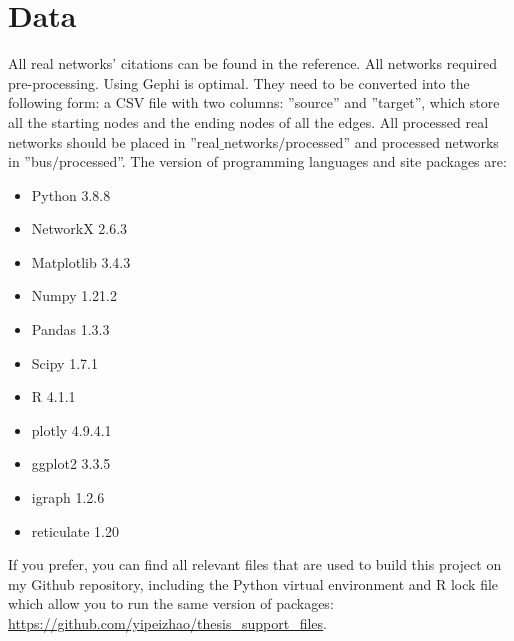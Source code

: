 \documentclass[12pt]{article}
\begin{document}
\appendix
\section{Data}
All real networks' citations can be found in the reference. All networks required pre-processing. Using Gephi is optimal. They need to be converted into the following form: a CSV file with two columns: ''source'' and ''target'', which store all the starting nodes and the ending nodes of all the edges. All processed real networks should be placed in ''real$\_$networks$/$processed'' and processed networks in ''bus$/$\-processed''. The version of programming languages and site packages are:
\begin{itemize}
    \item Python 3.8.8
    \item NetworkX 2.6.3
    \item Matplotlib 3.4.3
    \item Numpy 1.21.2
    \item Pandas 1.3.3
    \item Scipy 1.7.1
    \vspace{5mm}
    \item R 4.1.1
    \item plotly 4.9.4.1
    \item ggplot2 3.3.5
    \item igraph 1.2.6
    \item reticulate 1.20
\end{itemize}
If you prefer, you can find all relevant files that are used to build this project on my Github repository, including the Python virtual environment and R lock file which allow you to run the same version of packages: \url{https://github.com/yipeizhao/thesis_support_files}.
\end{document}
